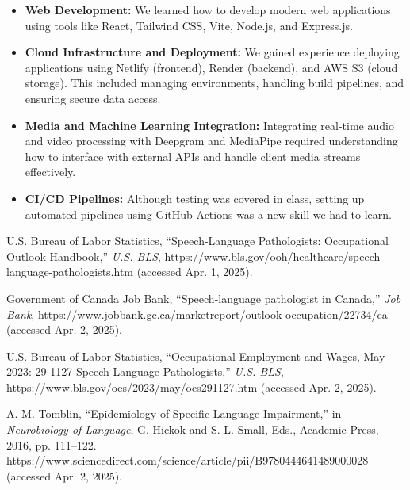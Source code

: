 \documentclass{article}
\begin{document}
\begin{itemize}
    \item \textbf{Web Development:} We learned how to develop modern web applications using tools like React, Tailwind CSS, Vite, Node.js, and Express.js.
    
    \item \textbf{Cloud Infrastructure and Deployment:} We gained experience deploying applications using Netlify (frontend), Render (backend), and AWS S3 (cloud storage). 
    This included managing environments, handling build pipelines, and ensuring secure data access.
    
    \item \textbf{Media and Machine Learning Integration:} Integrating real-time audio and video processing with Deepgram and MediaPipe required understanding how to interface with external APIs and handle client media streams effectively.
    
    \item \textbf{CI/CD Pipelines:} Although testing was covered in class, setting up automated pipelines using GitHub Actions was a new skill we had to learn.
\end{itemize}

\begin{thebibliography}{4}

    U.S. Bureau of Labor Statistics, “Speech-Language Pathologists: Occupational Outlook Handbook,” \textit{U.S. BLS}, https://www.bls.gov/ooh/healthcare/speech-language-pathologists.htm (accessed Apr. 1, 2025).
 
    Government of Canada Job Bank, “Speech-language pathologist in Canada,” \textit{Job Bank}, https://www.jobbank.gc.ca/marketreport/outlook-occupation/22734/ca (accessed Apr. 2, 2025).

    U.S. Bureau of Labor Statistics, “Occupational Employment and Wages, May 2023: 29-1127 Speech-Language Pathologists,” \textit{U.S. BLS}, https://www.bls.gov/oes/2023/may/oes291127.htm (accessed Apr. 2, 2025).

    A. M. Tomblin, “Epidemiology of Specific Language Impairment,” in \textit{Neurobiology of Language}, G. Hickok and S. L. Small, Eds., Academic Press, 2016, pp. 111–122. https://www.sciencedirect.com/science/article/pii/B9780444641489000028 (accessed Apr. 2, 2025).

\end{thebibliography}
\end{document}
